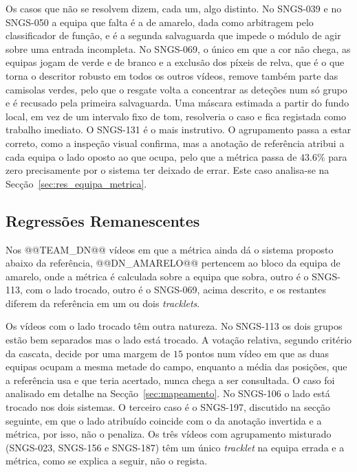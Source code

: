 Os casos que não se resolvem dizem, cada um, algo distinto. No SNGS-039 e no SNGS-050 a equipa que
falta é a de amarelo, dada como arbitragem pelo classificador de função, e é a segunda salvaguarda
que impede o módulo de agir sobre uma entrada incompleta. No SNGS-069, o único em que a cor não
chega, as equipas jogam de verde e de branco e a exclusão dos píxeis de relva, que é o que torna o
descritor robusto em todos os outros vídeos, remove também parte das camisolas verdes, pelo que o
resgate volta a concentrar as deteções num só grupo e é recusado pela primeira salvaguarda. Uma
máscara estimada a partir do fundo local, em vez de um intervalo fixo de tom, resolveria o caso e
fica registada como trabalho imediato. O SNGS-131 é o mais instrutivo. O agrupamento passa a estar
correto, como a inspeção visual confirma, mas a anotação de referência atribui a cada equipa o lado
oposto ao que ocupa, pelo que a métrica passa de $43.6\%$ para zero precisamente por o sistema ter
deixado de errar. Este caso analisa-se na Secção~\ref{sec:res_equipa_metrica}.

\subsection{Regressões Remanescentes}\label{sec:res_equipa_regressoes}

Nos @@TEAM_DN@@ vídeos em que a métrica ainda dá o sistema proposto abaixo da referência,
@@DN_AMARELO@@ pertencem ao bloco da equipa de amarelo, onde a métrica é calculada sobre a equipa
que sobra, outro é o SNGS-113, com o lado trocado, outro é o SNGS-069, acima descrito, e os restantes
diferem da referência em um ou dois \emph{tracklets}.

Os vídeos com o lado trocado têm outra natureza. No SNGS-113 os dois grupos estão bem
separados mas o lado está trocado. A votação relativa, segundo critério da cascata, decide por uma margem de
$15$ pontos num vídeo em que as duas equipas ocupam a mesma metade do campo, enquanto a média das
posições, que a referência usa e que teria acertado, nunca chega a ser consultada. O caso foi
analisado em detalhe na Secção~\ref{sec:mapeamento}. No SNGS-106 o lado está trocado nos dois
sistemas. O terceiro caso é o SNGS-197, discutido na secção seguinte, em que o lado atribuído
coincide com o da anotação invertida e a métrica, por isso, não o penaliza. Os três vídeos com agrupamento misturado (SNGS-023, SNGS-156 e SNGS-187) têm um único
\emph{tracklet} na equipa errada e a métrica, como se explica a seguir, não o regista.

